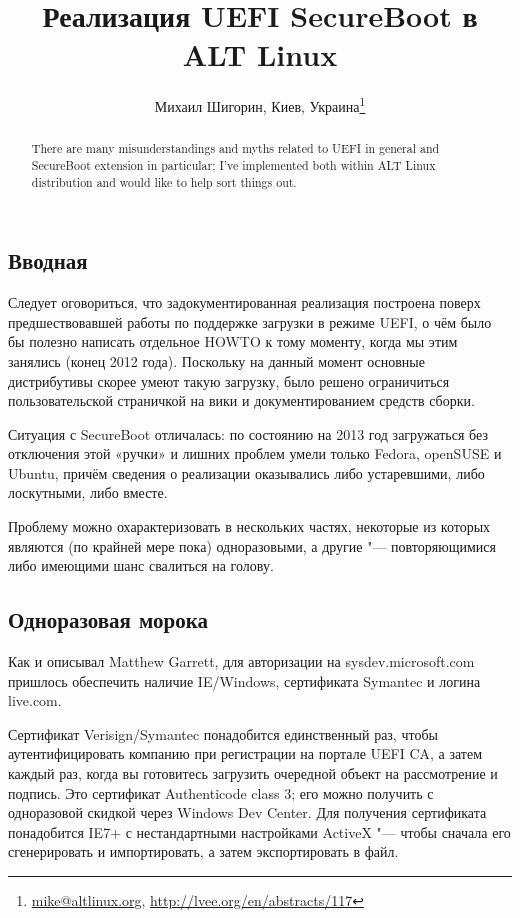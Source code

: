 \documentclass[10pt, a5paper]{article}
\begin{document}
\title{Реализация UEFI SecureBoot в ALT Linux}
\author{Михаил Шигорин, Киев, Украина\footnote{\url{mike@altlinux.org}, \url{http://lvee.org/en/abstracts/117}}}
\maketitle
\begin{abstract}
There are many misunderstandings and myths related to UEFI in general and SecureBoot extension in particular; I've imple\-mented both within ALT Linux distribution and would like to help sort things out.
\end{abstract}
\subsection*{Вводная}

Следует оговориться, что задокументированная реализация построена поверх предшествовавшей работы по поддержке загрузки в режиме UEFI, о чём было бы полезно написать отдельное HOWTO к тому моменту, когда мы этим занялись (конец 2012 года).  Поскольку на данный момент основные дистрибутивы скорее умеют такую загрузку, было решено ограничиться пользовательской страничкой на вики и документированием средств сборки.

Ситуация с SecureBoot отличалась: по состоянию на 2013 год загружаться без отключения этой «ручки» и лишних проблем умели только Fedora, openSUSE и Ubuntu, причём сведения о реализации оказывались либо устаревшими, либо лоскутными, либо вместе.

Проблему можно охарактеризовать в нескольких частях, некоторые из которых являются (по крайней мере пока) одноразовыми, а другие "--- повторяющимися либо имеющими шанс свалиться на голову.

\subsection*{Одноразовая морока}

Как и описывал Matthew Garrett, для авторизации на sysdev.mi\-cro\-soft.com пришлось обеспечить наличие IE/Windows, сертификата Symantec и логина live.com.

Сертификат Verisign/Symantec понадобится единственный раз, чтобы аутентифицировать компанию при регистрации на портале UEFI CA, а затем каждый раз, когда вы готовитесь загрузить очередной объект на рассмотрение и подпись. Это сертификат Au\-then\-ti\-code class 3; его можно получить с одноразовой скидкой через Windows Dev Center. Для получения сертификата понадобится IE7+ с нестандартными настройками ActiveX "--- чтобы сначала его сгенерировать и импортировать, а затем экспортировать в файл.
\end{document}
